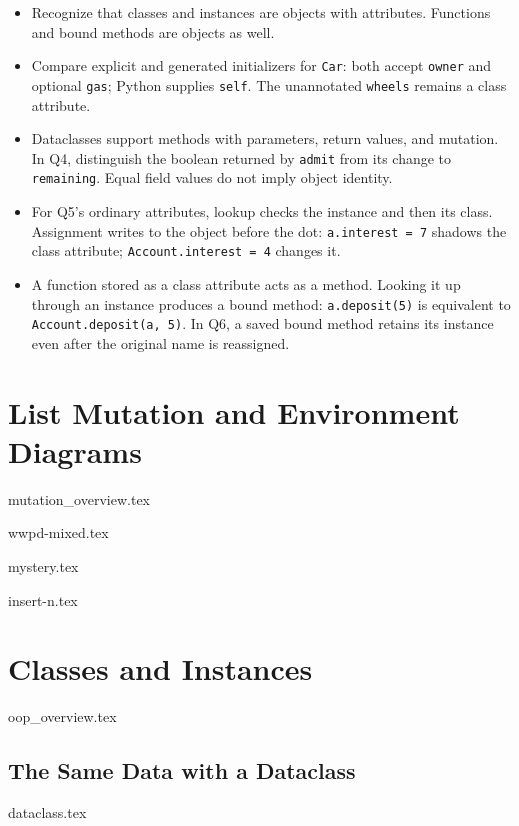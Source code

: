 \documentclass{exam}
\begin{document}
\begin{meta}
\begin{itemize}
    \item Recognize that classes and instances are objects with attributes. Functions and bound methods are objects as well.
    \item Compare explicit and generated initializers for \lstinline{Car}: both accept \lstinline{owner} and optional \lstinline{gas}; Python supplies \lstinline{self}. The unannotated \lstinline{wheels} remains a class attribute.
    \item Dataclasses support methods with parameters, return values, and mutation. In Q4, distinguish the boolean returned by \lstinline{admit} from its change to \lstinline{remaining}. Equal field values do not imply object identity.
    \item For Q5's ordinary attributes, lookup checks the instance and then its class. Assignment writes to the object before the dot: \lstinline{a.interest = 7} shadows the class attribute; \lstinline{Account.interest = 4} changes it.
    \item A function stored as a class attribute acts as a method. Looking it up through an instance produces a bound method: \lstinline{a.deposit(5)} is equivalent to \lstinline{Account.deposit(a, 5)}. In Q6, a saved bound method retains its instance even after the original name is reassigned.
\end{itemize}
\end{meta}

\section{List Mutation and Environment Diagrams}
\begingroup
{mutation_overview.tex}
\endgroup
\begin{questions}
    {wwpd-mixed.tex}

    {mystery.tex}

    {insert-n.tex}
\end{questions}

\newpage
\section{Classes and Instances}
\begingroup
{oop_overview.tex}
\endgroup

\subsection*{The Same Data with a Dataclass}
\begingroup
{dataclass.tex}
\endgroup
\end{document}
